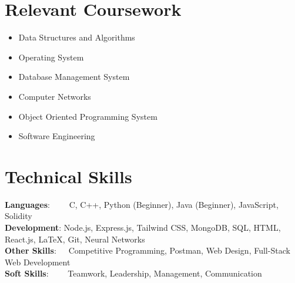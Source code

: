 \documentclass[letterpaper,11pt]{article}
\newcommand{\resumeSubHeadingListStart}{\begin{itemize}[leftmargin=0.0in, label={}]}
\newcommand{\resumeSubHeadingListEnd}{\end{itemize}}
\begin{document}
\section{Relevant Coursework}
    \setlength{\columnsep}{-15pt}
        \begin{multicols}{3}
            \begin{itemize}[itemsep=-3pt, parsep=3pt]
                \item\small Data Structures and Algorithms
                \item Operating System
                \item Database Management System
                \item Computer Networks
                \item Object Oriented Programming System 
                \item Software Engineering
            \end{itemize}
        \end{multicols}
        \vspace*{2.0\multicolsep}
\vspace{5pt}
%
\section{Technical Skills}
 \begin{itemize}[leftmargin=0.15in, label={}]
    \small{\item{
     \textbf{Languages}{:~~~~ C, C++, Python (Beginner), Java (Beginner), JavaScript, Solidity} \\ \vspace{3pt}
     \textbf{Development}{: Node.js, Express.js, Tailwind CSS, MongoDB, SQL, HTML, React.js, LaTeX, Git, Neural Networks} \\ \vspace{3pt}
     \textbf{Other Skills}{:~~~Competitive Programming, Postman, Web Design, Full-Stack Web Development} \\ \vspace{3pt}
\textbf{Soft Skills}{:~~~~ Teamwork, Leadership, Management, Communication} \\
    }}
 \end{itemize}
 \vspace{-15pt}
\end{document}
